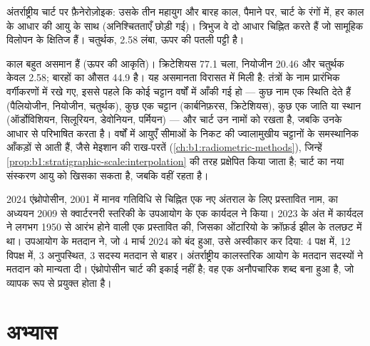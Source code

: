 \begin{omfigure}
{\small अंतर्राष्ट्रीय चार्ट पर फ़ैनेरोज़ोइक: उसके तीन महायुग और बारह काल, पैमाने पर, चार्ट के रंगों में, हर काल के आधार की आयु के साथ (अनिश्चितताएँ छोड़ी गई)। त्रिभुज वे दो आधार चिह्नित करते हैं जो सामूहिक विलोपन के क्षितिज हैं। चतुर्थक, \qty{2.58}{\Ma} लंबा, ऊपर की पतली पट्टी है।}
\label{fig:b1:stratigraphic-scale:chart}
\end{omfigure}

काल बहुत असमान हैं (ऊपर की आकृति)। क्रिटेशियस \qty{77.1}{\Myr} चला, नियोजीन \qty{20.46}{\Myr} और चतुर्थक केवल \qty{2.58}{\Myr}; बारहों का औसत \qty{44.9}{\Myr} है। यह असमानता विरासत में मिली है: तंत्रों के नाम प्रारंभिक वर्गीकरणों में रखे गए, इससे पहले कि कोई चट्टान वर्षों में आँकी गई हो --- कुछ नाम एक स्थिति देते हैं (पैलियोजीन, नियोजीन, चतुर्थक), कुछ एक चट्टान (कार्बनिफ़रस, क्रिटेशियस), कुछ एक जाति या स्थान (ऑर्डोविशियन, सिलूरियन, डेवोनियन, पर्मियन) --- और चार्ट उन नामों को रखता है, जबकि उनके आधार  से परिभाषित करता है। वर्षों में आयुएँ सीमाओं के निकट की ज्वालामुखीय चट्टानों के समस्थानिक आँकड़ों से आती हैं, जैसे मेइशान की राख-परतें (\cref{ch:b1:radiometric-methods}), जिन्हें \cref{prop:b1:stratigraphic-scale:interpolation} की तरह प्रक्षेपित किया जाता है; चार्ट का नया संस्करण आयु को खिसका सकता है, जबकि  वहीं रहता है।

\begin{dated}{2024}
एंथ्रोपोसीन, 2001 में मानव गतिविधि से चिह्नित एक नए अंतराल के लिए प्रस्तावित नाम, का अध्ययन 2009 से क्वार्टरनरी स्तरिकी के उपआयोग के एक कार्यदल ने किया। 2023 के अंत में कार्यदल ने लगभग 1950 से आरंभ होने वाली एक  प्रस्तावित की, जिसका  ओंटारियो के क्रॉफ़र्ड झील के तलछट में था। उपआयोग के मतदान ने, जो 4 मार्च 2024 को बंद हुआ, उसे अस्वीकार कर दिया: 4 पक्ष में, 12 विपक्ष में, 3 अनुपस्थित, 3 सदस्य मतदान से बाहर। अंतर्राष्ट्रीय कालस्तरिक आयोग के मतदान सदस्यों ने मतदान को मान्यता दी। एंथ्रोपोसीन चार्ट की इकाई नहीं है; वह एक अनौपचारिक शब्द बना हुआ है, जो व्यापक रूप से प्रयुक्त होता है।
\end{dated}

\section{अभ्यास}

